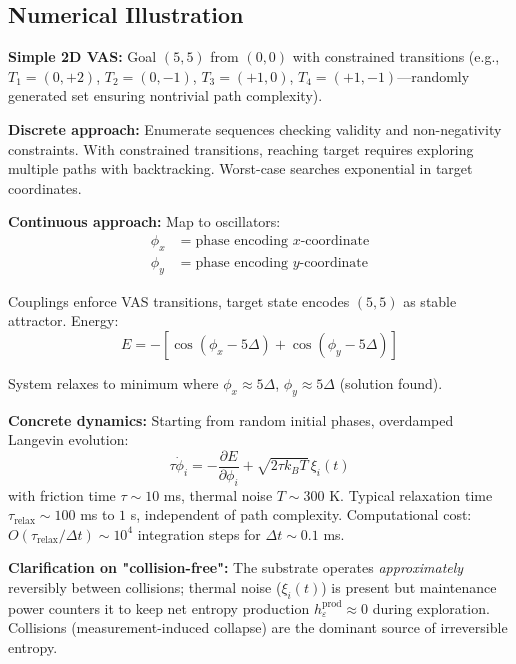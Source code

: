 \documentclass[12pt]{article}
\begin{document}
\subsection{Numerical Illustration}

\textbf{Simple 2D VAS:} Goal $(5,5)$ from $(0,0)$ with constrained transitions (e.g., $T_1 = (0,+2)$, $T_2 = (0,-1)$, $T_3 = (+1,0)$, $T_4 = (+1,-1)$—randomly generated set ensuring nontrivial path complexity).

\textbf{Discrete approach:} Enumerate sequences checking validity and non-negativity constraints. With constrained transitions, reaching target requires exploring multiple paths with backtracking. Worst-case searches exponential in target coordinates.

\textbf{Continuous approach:} Map to oscillators:
\begin{equation}
\begin{aligned}
\phi_x &= \text{phase encoding } x\text{-coordinate} \\
\phi_y &= \text{phase encoding } y\text{-coordinate}
\end{aligned}
\end{equation}

Couplings enforce VAS transitions, target state encodes $(5,5)$ as stable attractor. Energy:
\begin{equation}
E = -[\cos(\phi_x - 5\Delta) + \cos(\phi_y - 5\Delta)]
\end{equation}

System relaxes to minimum where $\phi_x \approx 5\Delta$, $\phi_y \approx 5\Delta$ (solution found).

\textbf{Concrete dynamics:} Starting from random initial phases, overdamped Langevin evolution:
\begin{equation}
\label{eq:langevin}
\tau \dot{\phi}_i = -\frac{\partial E}{\partial \phi_i} + \sqrt{2\tau k_B T}\, \xi_i(t)
\end{equation}
with friction time $\tau \sim 10$ ms, thermal noise $T \sim 300$ K. Typical relaxation time $\tau_{\text{relax}} \sim 100$ ms to $1$ s, independent of path complexity. Computational cost: $O(\tau_{\text{relax}}/\Delta t) \sim 10^4$ integration steps for $\Delta t \sim 0.1$ ms.

\textbf{Clarification on "collision-free":} The substrate operates \textit{approximately} reversibly between collisions; thermal noise ($\xi_i(t)$) is present but maintenance power counters it to keep net entropy production $h_\varepsilon^{\text{prod}} \approx 0$ during exploration. Collisions (measurement-induced collapse) are the dominant source of irreversible entropy.
\end{document}
